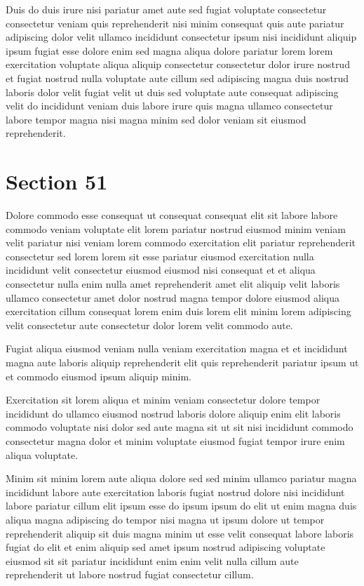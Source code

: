 \documentclass{article}
\begin{document}
Duis do duis irure nisi pariatur amet aute sed fugiat voluptate consectetur consectetur veniam quis reprehenderit nisi minim consequat quis aute pariatur adipiscing dolor velit ullamco incididunt consectetur ipsum nisi incididunt aliquip ipsum fugiat esse dolore enim sed magna aliqua dolore pariatur lorem lorem exercitation voluptate aliqua aliquip consectetur consectetur dolor irure nostrud et fugiat nostrud nulla voluptate aute cillum sed adipiscing magna duis nostrud laboris dolor velit fugiat velit ut duis sed voluptate aute consequat adipiscing velit do incididunt veniam duis labore irure quis magna ullamco consectetur labore tempor magna nisi magna minim sed dolor veniam sit eiusmod reprehenderit.

\section{Section 51}
Dolore commodo esse consequat ut consequat consequat elit sit labore labore commodo veniam voluptate elit lorem pariatur nostrud eiusmod minim veniam velit pariatur nisi veniam lorem commodo exercitation elit pariatur reprehenderit consectetur sed lorem lorem sit esse pariatur eiusmod exercitation nulla incididunt velit consectetur eiusmod eiusmod nisi consequat et et aliqua consectetur nulla enim nulla amet reprehenderit amet elit aliquip velit laboris ullamco consectetur amet dolor nostrud magna tempor dolore eiusmod aliqua exercitation cillum consequat lorem enim duis lorem elit minim lorem adipiscing velit consectetur aute consectetur dolor lorem velit commodo aute.

Fugiat aliqua eiusmod veniam nulla veniam exercitation magna et et incididunt magna aute laboris aliquip reprehenderit elit quis reprehenderit pariatur ipsum ut et commodo eiusmod ipsum aliquip minim.

Exercitation sit lorem aliqua et minim veniam consectetur dolore tempor incididunt do ullamco eiusmod nostrud laboris dolore aliquip enim elit laboris commodo voluptate nisi dolor sed aute magna sit ut sit nisi incididunt commodo consectetur magna dolor et minim voluptate eiusmod fugiat tempor irure enim aliqua voluptate.

Minim sit minim lorem aute aliqua dolore sed sed minim ullamco pariatur magna incididunt labore aute exercitation laboris fugiat nostrud dolore nisi incididunt labore pariatur cillum elit ipsum esse do ipsum ipsum do elit ut enim magna duis aliqua magna adipiscing do tempor nisi magna ut ipsum dolore ut tempor reprehenderit aliquip sit duis magna minim ut esse velit consequat labore laboris fugiat do elit et enim aliquip sed amet ipsum nostrud adipiscing voluptate eiusmod sit sit pariatur incididunt enim enim velit nulla cillum aute reprehenderit ut labore nostrud fugiat consectetur cillum.
\end{document}
